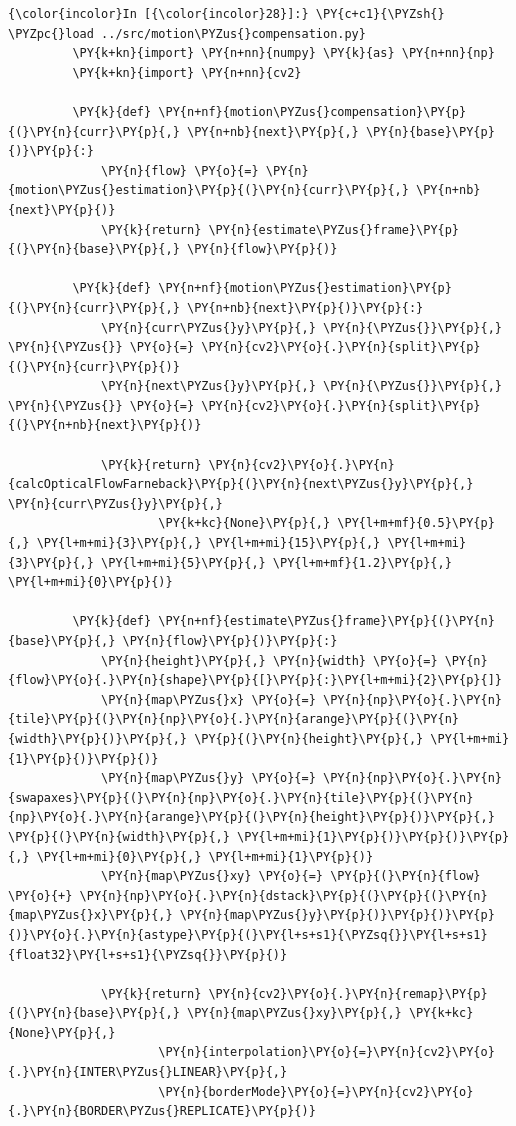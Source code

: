     \begin{Verbatim}[commandchars=\\\{\}]
{\color{incolor}In [{\color{incolor}28}]:} \PY{c+c1}{\PYZsh{} \PYZpc{}load ../src/motion\PYZus{}compensation.py}
         \PY{k+kn}{import} \PY{n+nn}{numpy} \PY{k}{as} \PY{n+nn}{np}
         \PY{k+kn}{import} \PY{n+nn}{cv2}
         
         \PY{k}{def} \PY{n+nf}{motion\PYZus{}compensation}\PY{p}{(}\PY{n}{curr}\PY{p}{,} \PY{n+nb}{next}\PY{p}{,} \PY{n}{base}\PY{p}{)}\PY{p}{:}
             \PY{n}{flow} \PY{o}{=} \PY{n}{motion\PYZus{}estimation}\PY{p}{(}\PY{n}{curr}\PY{p}{,} \PY{n+nb}{next}\PY{p}{)}
             \PY{k}{return} \PY{n}{estimate\PYZus{}frame}\PY{p}{(}\PY{n}{base}\PY{p}{,} \PY{n}{flow}\PY{p}{)}
         
         \PY{k}{def} \PY{n+nf}{motion\PYZus{}estimation}\PY{p}{(}\PY{n}{curr}\PY{p}{,} \PY{n+nb}{next}\PY{p}{)}\PY{p}{:}
             \PY{n}{curr\PYZus{}y}\PY{p}{,} \PY{n}{\PYZus{}}\PY{p}{,} \PY{n}{\PYZus{}} \PY{o}{=} \PY{n}{cv2}\PY{o}{.}\PY{n}{split}\PY{p}{(}\PY{n}{curr}\PY{p}{)}
             \PY{n}{next\PYZus{}y}\PY{p}{,} \PY{n}{\PYZus{}}\PY{p}{,} \PY{n}{\PYZus{}} \PY{o}{=} \PY{n}{cv2}\PY{o}{.}\PY{n}{split}\PY{p}{(}\PY{n+nb}{next}\PY{p}{)}
         
             \PY{k}{return} \PY{n}{cv2}\PY{o}{.}\PY{n}{calcOpticalFlowFarneback}\PY{p}{(}\PY{n}{next\PYZus{}y}\PY{p}{,} \PY{n}{curr\PYZus{}y}\PY{p}{,} 
                     \PY{k+kc}{None}\PY{p}{,} \PY{l+m+mf}{0.5}\PY{p}{,} \PY{l+m+mi}{3}\PY{p}{,} \PY{l+m+mi}{15}\PY{p}{,} \PY{l+m+mi}{3}\PY{p}{,} \PY{l+m+mi}{5}\PY{p}{,} \PY{l+m+mf}{1.2}\PY{p}{,} \PY{l+m+mi}{0}\PY{p}{)}
         
         \PY{k}{def} \PY{n+nf}{estimate\PYZus{}frame}\PY{p}{(}\PY{n}{base}\PY{p}{,} \PY{n}{flow}\PY{p}{)}\PY{p}{:}
             \PY{n}{height}\PY{p}{,} \PY{n}{width} \PY{o}{=} \PY{n}{flow}\PY{o}{.}\PY{n}{shape}\PY{p}{[}\PY{p}{:}\PY{l+m+mi}{2}\PY{p}{]}
             \PY{n}{map\PYZus{}x} \PY{o}{=} \PY{n}{np}\PY{o}{.}\PY{n}{tile}\PY{p}{(}\PY{n}{np}\PY{o}{.}\PY{n}{arange}\PY{p}{(}\PY{n}{width}\PY{p}{)}\PY{p}{,} \PY{p}{(}\PY{n}{height}\PY{p}{,} \PY{l+m+mi}{1}\PY{p}{)}\PY{p}{)}
             \PY{n}{map\PYZus{}y} \PY{o}{=} \PY{n}{np}\PY{o}{.}\PY{n}{swapaxes}\PY{p}{(}\PY{n}{np}\PY{o}{.}\PY{n}{tile}\PY{p}{(}\PY{n}{np}\PY{o}{.}\PY{n}{arange}\PY{p}{(}\PY{n}{height}\PY{p}{)}\PY{p}{,} \PY{p}{(}\PY{n}{width}\PY{p}{,} \PY{l+m+mi}{1}\PY{p}{)}\PY{p}{)}\PY{p}{,} \PY{l+m+mi}{0}\PY{p}{,} \PY{l+m+mi}{1}\PY{p}{)}
             \PY{n}{map\PYZus{}xy} \PY{o}{=} \PY{p}{(}\PY{n}{flow} \PY{o}{+} \PY{n}{np}\PY{o}{.}\PY{n}{dstack}\PY{p}{(}\PY{p}{(}\PY{n}{map\PYZus{}x}\PY{p}{,} \PY{n}{map\PYZus{}y}\PY{p}{)}\PY{p}{)}\PY{p}{)}\PY{o}{.}\PY{n}{astype}\PY{p}{(}\PY{l+s+s1}{\PYZsq{}}\PY{l+s+s1}{float32}\PY{l+s+s1}{\PYZsq{}}\PY{p}{)}
         
             \PY{k}{return} \PY{n}{cv2}\PY{o}{.}\PY{n}{remap}\PY{p}{(}\PY{n}{base}\PY{p}{,} \PY{n}{map\PYZus{}xy}\PY{p}{,} \PY{k+kc}{None}\PY{p}{,} 
                     \PY{n}{interpolation}\PY{o}{=}\PY{n}{cv2}\PY{o}{.}\PY{n}{INTER\PYZus{}LINEAR}\PY{p}{,}
                     \PY{n}{borderMode}\PY{o}{=}\PY{n}{cv2}\PY{o}{.}\PY{n}{BORDER\PYZus{}REPLICATE}\PY{p}{)}
\end{Verbatim}


